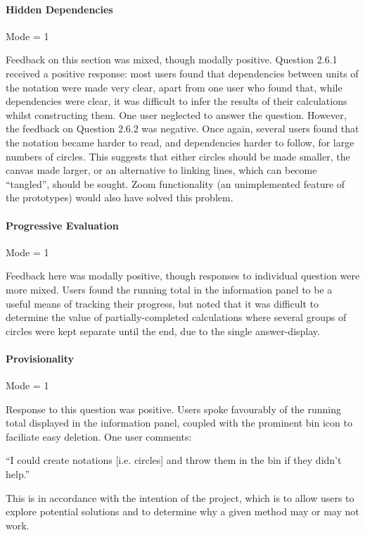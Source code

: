 \documentclass[12pt,twoside,notitlepage,xetex]{report}
\begin{document}
\paragraph{Hidden Dependencies}\hfill

Mode = 1

Feedback on this section was mixed, though modally positive.  Question 2.6.1 received a positive response: most users found that dependencies between units of the notation were made very clear, apart from one user who found that, while dependencies were clear, it was difficult to infer the results of their calculations whilst constructing them.  One user neglected to answer the question.  However, the feedback on Question 2.6.2 was negative.  Once again, several users found that the notation became harder to read, and dependencies harder to follow, for large numbers of circles.  This suggests that either circles should be made smaller, the canvas made larger, or an alternative to linking lines, which can become ``tangled'', should be sought.  Zoom functionality (an unimplemented feature of the prototypes) would also have solved this problem.

\paragraph{Progressive Evaluation}\hfill

Mode = 1

Feedback here was modally positive, though responses to individual question were more mixed.  Users found the running total in the information panel to be a useful means of tracking their progress, but noted that it was difficult to determine the value of partially-completed calculations where several groups of circles were kept separate until the end, due to the single answer-display.

\paragraph{Provisionality}\hfill

Mode = 1

Response to this question was positive.  Users spoke favourably of the running total displayed in the information panel, coupled with the prominent bin icon to faciliate easy deletion.  One user comments:
\begin{center}
\parbox[c]{\textwidth-2cm}{
\small
``I could create notations [i.e. circles] and throw them in the bin if they didn't help.''
}
\end{center}
This is in accordance with the intention of the project, which is to allow users to explore potential solutions and to determine why a given method may or may not work.
\end{document}
